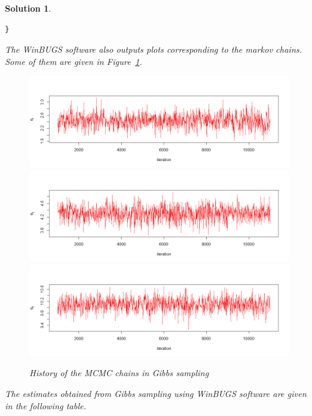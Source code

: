 \documentclass[12pt]{article}
\theoremstyle{problemstyle}
\newtheorem*{solution*}{Solution}
\begin{document}
\begin{solution*}
\begin{lstlisting}
}
\end{lstlisting}

The WinBUGS software also outputs plots corresponding to the markov chains. Some of them are given in Figure~\ref{fig:convergence}.


\begin{figure}[htbp]
    \centering
    \caption{History of the MCMC chains in Gibbs sampling}
    \label{fig:convergence}
    \includegraphics[width = \textwidth]{theta1_convergence.png}
    \includegraphics[width = \textwidth]{theta2_convergence.png}
    \includegraphics[width = \textwidth]{theta5_convergence.png}
\end{figure}


The estimates obtained from Gibbs sampling using WinBUGS software are given in the following table.


\end{solution*}
\end{document}
